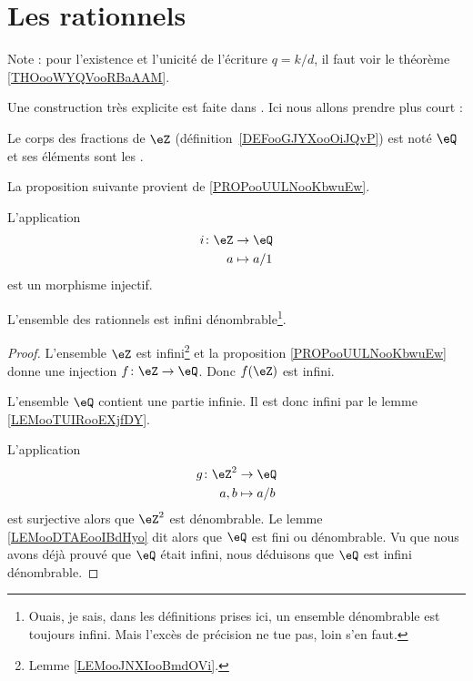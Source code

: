 \section{Les rationnels}

Note : pour l'existence et l'unicité de l'écriture \( q=k/d\), il faut voir le théorème \ref{THOooWYQVooRBaAAM}.


Une construction très explicite est faite dans \cite{RWWJooJdjxEK}. Ici nous allons prendre plus court :
\begin{definition}
	Le corps des fractions de \( \eZ\) (définition~\ref{DEFooGJYXooOiJQvP}) est noté \( \eQ\) et ses éléments sont les .
\end{definition}


La proposition suivante provient de \ref{PROPooUULNooKbwuEw}.
\begin{proposition}	\label{PROPooKUIYooCxMHTX}
	L'application
	\begin{equation}
		\begin{aligned}
			i\colon \eZ & \to \eQ     \\
			a           & \mapsto a/1
		\end{aligned}
	\end{equation}
	est un morphisme injectif.
\end{proposition}


\begin{proposition}     \label{PROPooDHIAooZysvNs}
	L'ensemble des rationnels est infini dénombrable\footnote{Ouais, je sais, dans les définitions prises ici, un ensemble dénombrable est toujours infini. Mais l'excès de précision ne tue pas, loin s'en faut.}.
\end{proposition}

\begin{proof}
	L'ensemble \( \eZ\) est infini\footnote{Lemme \ref{LEMooJNXIooBmdOVi}.} et la proposition \ref{PROPooUULNooKbwuEw} donne une injection \( f\colon \eZ\to \eQ\). Donc \( f(\eZ)\) est infini.

	L'ensemble \( \eQ\) contient une partie infinie. Il est donc infini par le lemme \ref{LEMooTUIRooEXjfDY}.

	L'application
	\begin{equation}
		\begin{aligned}
			g\colon \eZ^2 & \to \eQ     \\
			a,b           & \mapsto a/b
		\end{aligned}
	\end{equation}
	est surjective alors que \( \eZ^2\) est dénombrable. Le lemme \ref{LEMooDTAEooIBdHyo} dit alors que \( \eQ\) est fini ou dénombrable. Vu que nous avons déjà prouvé que \( \eQ\) était infini, nous déduisons que \( \eQ\) est infini dénombrable.
\end{proof}


